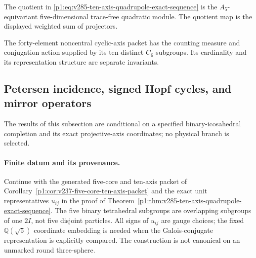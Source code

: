 \documentclass[11pt]{article}
\begin{document}
\begin{remark}
The quotient in
\eqref{p1:eq:v285-ten-axis-quadrupole-exact-sequence} is the
\(A_5\)-equivariant five-dimensional trace-free quadratic module.
The quotient map is the displayed weighted sum of projectors.
\end{remark}

\begin{remark}
\label{p1:rem:v237-forty-packet-clock-firewall}
The forty-element noncentral cyclic-axis packet has the counting measure
and conjugation action supplied by its ten distinct \(C_6\) subgroups.
Its cardinality and its representation structure are separate invariants.
\end{remark}

\subsection{Petersen incidence, signed Hopf cycles, and mirror operators}
\label{p1:sec:petersen-finite-resolution}
The results of this subsection are conditional on a specified binary-icosahedral
completion and its exact projective-axis coordinates; no physical branch is selected.

\paragraph{Finite datum and its provenance.}
Continue with the generated five-core and ten-axis packet of
Corollary~\ref{p1:cor:v237-five-core-ten-axis-packet} and the exact unit
representatives $u_{ij}$ in the proof of
Theorem~\ref{p1:thm:v285-ten-axis-quadrupole-exact-sequence}.  The five
binary tetrahedral subgroups are overlapping subgroups of one $2I$,
not five disjoint particles. All signs of $u_{ij}$ are gauge choices;
the fixed $\mathbb Q(\sqrt5)$ coordinate embedding is needed when the
Galois-conjugate representation is explicitly compared. The construction
is not canonical on an unmarked round three-sphere.
\end{document}
